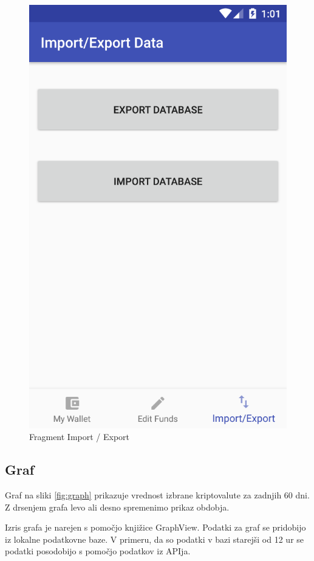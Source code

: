 \documentclass[11pt,a4paper]{article}
\begin{document}
\begin{figure}[htb]
	\begin{center}
		\includegraphics[width=0.8\columnwidth]{import_export.png}
	\end{center}
	\caption{Fragment Import / Export}
	\label{fig:emport_export}
\end{figure}


\subsection{Graf}

Graf na sliki \ref{fig:graph} prikazuje vrednost izbrane kriptovalute za zadnjih 60 dni. Z drsenjem
grafa levo ali desno spremenimo prikaz obdobja.

Izris grafa je narejen s pomočjo knjižice GraphView\cite{agw}.
Podatki za graf se pridobijo iz lokalne podatkovne baze. V primeru, da
so podatki v bazi starejši od 12 ur se podatki posodobijo s pomočjo 
podatkov iz APIja.
\end{document}
